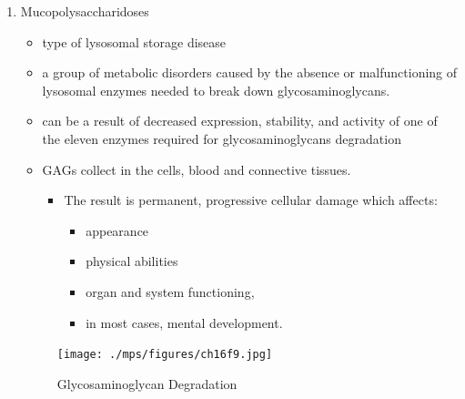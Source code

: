 \documentclass{scrartcl}
\begin{document}
\begin{enumerate}
\item Mucopolysaccharidoses
\label{sec:org4263f1c}
\begin{itemize}
\item type of lysosomal storage disease
\item a group of metabolic disorders caused by the absence or
malfunctioning of lysosomal enzymes needed to break down
glycosaminoglycans.
\item can be a result of decreased expression, stability, and activity of
one of the eleven enzymes required for glycosaminoglycans
degradation
\item GAGs collect in the cells, blood and connective tissues.
\begin{itemize}
\item The result is permanent, progressive cellular damage which affects:
\begin{itemize}
\item appearance
\item physical abilities
\item organ and system functioning,
\item in most cases, mental development.
\end{itemize}
\end{itemize}
\end{itemize}

\begin{figure}[htbp]
\centering
\texttt{[image: ./mps/figures/ch16f9.jpg]}
\caption[Glycosaminoglycan Degradation]{\label{fig:orgd115fff}
Glycosaminoglycan Degradation}
\end{figure}





\end{enumerate}
\end{document}
